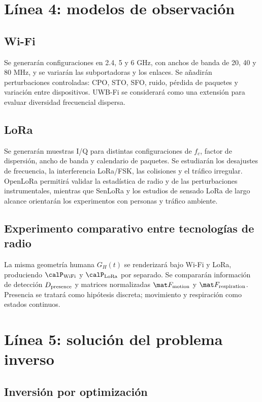 \section{Línea 4: modelos de observación}

\subsection{Wi-Fi}

Se generarán configuraciones en 2.4, 5 y 6 GHz, con anchos de banda de 20, 40 y 80 MHz, y se variarán las subportadoras y los enlaces. Se añadirán perturbaciones controladas: CPO, STO, SFO, ruido, pérdida de paquetes y variación entre dispositivos. UWB-Fi se considerará como una extensión para evaluar diversidad frecuencial dispersa.

\subsection{LoRa}

Se generarán muestras I/Q para distintas configuraciones de $f_c$, factor de dispersión, ancho de banda y calendario de paquetes. Se estudiarán los desajustes de frecuencia, la interferencia LoRa/FSK, las colisiones y el tráfico irregular. OpenLoRa permitirá validar la estadística de radio y de las perturbaciones instrumentales, mientras que SenLoRa y los estudios de sensado LoRa de largo alcance orientarán los experimentos con personas y tráfico ambiente.

\subsection{Experimento comparativo entre tecnologías de radio}

La misma geometría humana $G_H(t)$ se renderizará bajo Wi-Fi y LoRa, produciendo $\calP_{\rm WiFi}$ y $\calP_{\rm LoRa}$ por separado. Se compararán información de detección $D_{\rm presence}$ y matrices normalizadas $\mat F_{\rm motion}$ y $\mat F_{\rm respiration}$. Presencia se tratará como hipótesis discreta; movimiento y respiración como estados continuos.

\section{Línea 5: solución del problema inverso}

\subsection{Inversión por optimización}

